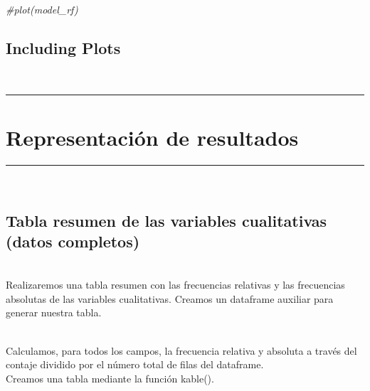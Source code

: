 \documentclass[
]{article}
\newenvironment{Shaded}{\begin{snugshade}}{\end{snugshade}}
\newcommand{\CommentTok}[1]{\textcolor[rgb]{0.56,0.35,0.01}{\textit{#1}}}
\begin{document}
\begin{Shaded}
\begin{Highlighting}[]
\CommentTok{#plot(model_rf)}
\end{Highlighting}
\end{Shaded}

\hypertarget{including-plots}{%
\subsection{Including Plots}\label{including-plots}}

\texttt{}\\
\texttt{}

\begin{center}\rule{0.5\linewidth}{0.5pt}\end{center}

\hypertarget{representaciuxf3n-de-resultados}{%
\section{\texorpdfstring{\textbf{Representación de
resultados}}{Representación de resultados}}\label{representaciuxf3n-de-resultados}}

\begin{center}\rule{0.5\linewidth}{0.5pt}\end{center}

\texttt{}\\
\texttt{}

\hypertarget{tabla-resumen-de-las-variables-cualitativas-datos-completos}{%
\subsection{Tabla resumen de las variables cualitativas (datos
completos)}\label{tabla-resumen-de-las-variables-cualitativas-datos-completos}}

\texttt{}\\
Realizaremos una tabla resumen con las frecuencias relativas y las
frecuencias absolutas de las variables cualitativas. Creamos un
dataframe auxiliar para generar nuestra tabla.

\texttt{}\\
Calculamos, para todos los campos, la frecuencia relativa y absoluta a
través del contaje dividido por el número total de filas del dataframe.
\texttt{}\\
Creamos una tabla mediante la función kable().

\texttt{}
\end{document}
